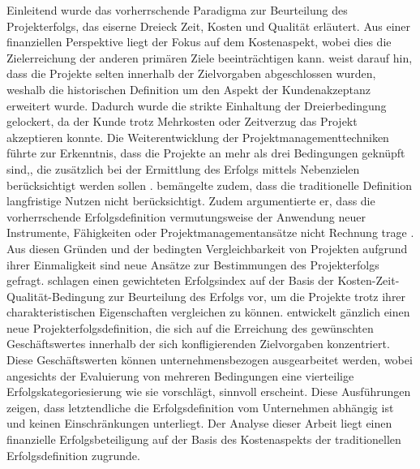 \newline\newline
Einleitend wurde das vorherrschende Paradigma zur Beurteilung des Projekterfolgs, das eiserne Dreieck Zeit, Kosten und Qualität erläutert. Aus einer finanziellen Perspektive liegt der Fokus auf dem Kostenaspekt, wobei dies die Zielerreichung der anderen primären Ziele beeinträchtigen kann. \citealp[S.~40]{kerz14} weist darauf hin, dass die Projekte selten innerhalb der Zielvorgaben abgeschlossen wurden, weshalb die historischen Definition um den Aspekt der Kundenakzeptanz erweitert wurde. Dadurch wurde die strikte Einhaltung der Dreierbedingung gelockert, da der Kunde trotz Mehrkosten oder Zeitverzug das Projekt akzeptieren konnte. Die Weiterentwicklung der Projektmanagementtechniken führte zur Erkenntnis, dass die Projekte an mehr als drei Bedingungen geknüpft sind,, die zusätzlich bei der Ermittlung des Erfolgs mittels Nebenzielen berücksichtigt werden sollen \citet[S.~41]{kerz14}. \citep{Atk1999} bemängelte zudem, dass die traditionelle Definition langfristige Nutzen nicht berücksichtigt. Zudem argumentierte er, dass die vorherrschende Erfolgsdefinition vermutungsweise der Anwendung neuer Instrumente, Fähigkeiten oder Projektmanagementansätze nicht Rechnung trage \citet{Atk1999}. Aus diesen Gründen und der bedingten Vergleichbarkeit von Projekten aufgrund ihrer Einmaligkeit sind neue Ansätze zur Bestimmungen des Projekterfolgs gefragt. \citep{lchch08} schlagen einen gewichteten Erfolgsindex auf der Basis der Kosten-Zeit-Qualität-Bedingung zur Beurteilung des Erfolgs vor, um die Projekte trotz ihrer charakteristischen Eigenschaften vergleichen zu können. \citep{kerz14} entwickelt gänzlich einen neue Projekterfolgsdefinition, die sich auf die Erreichung des gewünschten Geschäftswertes innerhalb der sich konfligierenden Zielvorgaben konzentriert. Diese Geschäftswerten können unternehmensbezogen ausgearbeitet werden, wobei angesichts der Evaluierung von mehreren Bedingungen eine vierteilige Erfolgskategoriesierung wie sie \citep[S.~48]{kerz14} vorschlägt, sinnvoll erscheint. Diese Ausführungen zeigen, dass letztendliche die Erfolgsdefinition vom Unternehmen abhängig ist und keinen Einschränkungen unterliegt. Der Analyse dieser Arbeit liegt einen finanzielle Erfolgsbeteiligung auf der Basis des Kostenaspekts der traditionellen Erfolgsdefinition zugrunde.
\newline\newline
